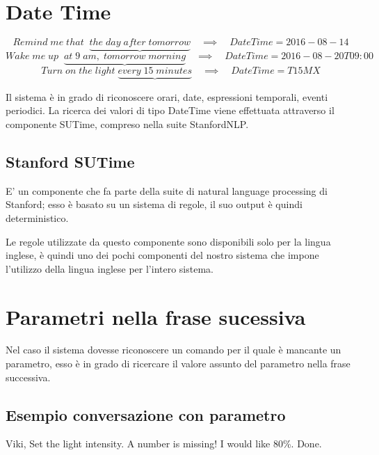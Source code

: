 \documentclass[twoside]{supsistudent}
\begin{document}
\section{Date Time}
\begin{center}
\[
Remind\;me\;that\;\;
\underbrace{the\;day\;after\;tomorrow}
\quad\implies\quad DateTime = 2016-08-14
\]
\[
Wake\;me\;up\;\;
\underbrace{at\;9\;am,\;tomorrow\;morning}
\quad\implies\quad DateTime = 2016-08-20T09:00
\]
\[
Turn\;on\;the\;light\;
\underbrace{every\;15\;minutes}
\quad\implies\quad DateTime = T15MX
\]
\end{center}
Il sistema è in grado di riconoscere orari, date, espressioni temporali, eventi periodici. La ricerca dei valori di tipo DateTime viene effettuata attraverso il componente SUTime, compreso nella suite StanfordNLP.\cite{stanfordSUTime}

\subsection{Stanford SUTime}
E' un componente che fa parte della suite di natural language processing di Stanford; esso è basato su un sistema di regole, il suo output è quindi deterministico.

Le regole utilizzate da questo componente sono disponibili solo per la lingua inglese, è quindi uno dei pochi componenti del nostro sistema che impone l'utilizzo della lingua inglese per l'intero sistema.

\newpage
\section{Parametri nella frase sucessiva}
Nel caso il sistema dovesse riconoscere un comando per il quale è mancante un parametro, esso è in grado di ricercare il valore assunto del parametro nella frase successiva.
\subsection{Esempio conversazione con parametro}
\begin{dialogue}
 Viki, Set the light intensity.
 A number is missing!
 I would like 80\%.
 Done.
\end{dialogue}
\end{document}
